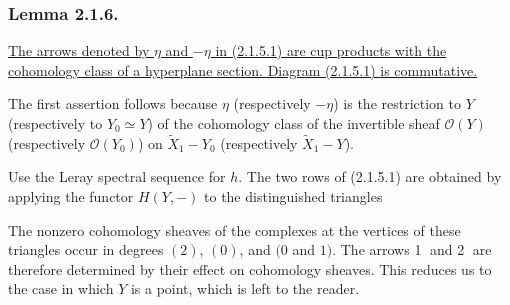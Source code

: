 \subsubsection*{Lemma 2.1.6.}
\underline{The arrows denoted by $\eta$ and $-\eta$ in (2.1.5.1)
are cup products with the cohomology class of a hyperplane section.
Diagram (2.1.5.1) is commutative.}

The first assertion follows because $\eta$ (respectively $-\eta$)
is the restriction to $Y$ (respectively to $Y_0\simeq Y$) of the
cohomology class of the invertible sheaf $\mathcal O(Y)$
(respectively $\mathcal O(Y_0)$) on $\widetilde X_1-Y_0$
(respectively $\widetilde X_1-Y$).

Use the Leray spectral sequence for $h$.  The two rows of (2.1.5.1)
are obtained by applying the functor $H(Y,-)$ to the distinguished
triangles
\begin{center}
\end{center}
The nonzero cohomology sheaves of the complexes at the vertices of
these triangles occur in degrees $(2)$, $(0)$, and $(0$ and $1)$.
The arrows \textcircled{\scriptsize 1} and
\textcircled{\scriptsize 2} are therefore determined by their effect
on cohomology sheaves.  This reduces us to the case in which $Y$ is
a point, which is left to the reader.
